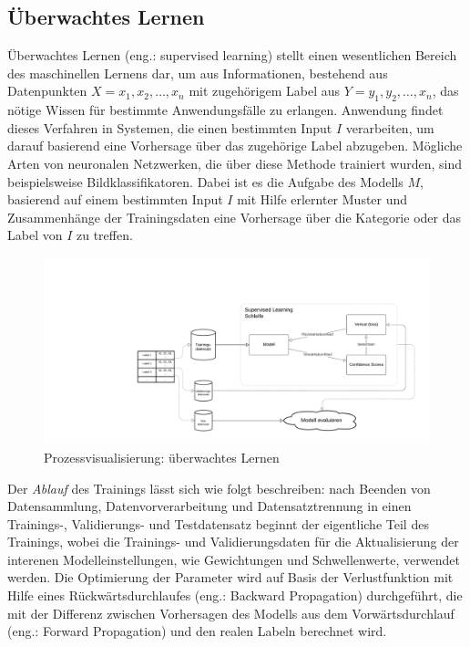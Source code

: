 \subsection{Überwachtes Lernen}\label{subsec:supervisedlearning}
Überwachtes Lernen (eng.: supervised learning) stellt einen wesentlichen Bereich des maschinellen Lernens dar, um aus Informationen, bestehend aus Datenpunkten \textit{$X = x_1, x_2, \ldots, x_n$} mit zugehörigem Label aus \textit{$Y = y_1, y_2, \ldots, x_n$}, das nötige Wissen für bestimmte Anwendungsfälle zu erlangen. Anwendung findet dieses Verfahren in Systemen, die einen bestimmten Input $I$ verarbeiten, um darauf basierend eine Vorhersage über das zugehörige Label abzugeben.
Mögliche Arten von neuronalen Netzwerken, die über diese Methode trainiert wurden, sind beispielsweise Bildklassifikatoren. Dabei ist es die Aufgabe des Modells $M$, basierend auf einem bestimmten Input $I$ mit Hilfe erlernter Muster und Zusammenhänge der Trainingsdaten eine Vorhersage über die Kategorie oder das Label von $I$ zu treffen.
\begin{figure}[H]
	\hspace{-30mm}
	\centering
	\includegraphics[width=0.8\linewidth]{Bilder/SupervisedLearning.png}
	\caption{Prozessvisualisierung: überwachtes Lernen}
\end{figure}
Der \textit{Ablauf} des Trainings lässt sich wie folgt beschreiben: nach Beenden von Datensammlung, Datenvorverarbeitung und Datensatztrennung in einen Trainings-, Validierungs- und Testdatensatz beginnt der eigentliche Teil des Trainings, wobei die Trainings- und Validierungsdaten für die Aktualisierung der interenen Modelleinstellungen, wie Gewichtungen und Schwellenwerte, verwendet werden. Die Optimierung der Parameter wird auf Basis der Verlustfunktion mit Hilfe eines Rückwärtsdurchlaufes (eng.: Backward Propagation) durchgeführt, die mit der Differenz zwischen Vorhersagen des Modells aus dem Vorwärtsdurchlauf (eng.: Forward Propagation) und den realen Labeln berechnet wird.

